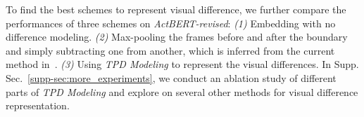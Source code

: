 \documentclass[runningheads]{llncs}
\begin{document}
To find the best schemes to represent visual difference, we further compare the performances of three schemes on \textit{ActBERT-revised}: \textit{(1)} Embedding with no difference modeling. \textit{(2)} Max-pooling the frames before and after the boundary and simply subtracting one from another, which is inferred from the current method in~\cite{park2019robust}. \textit{(3)} Using \textit{TPD Modeling} to represent the visual differences. In Supp. Sec.~\ref{supp-sec:more_experiments}, we conduct an ablation study of different parts of \textit{TPD Modeling} and explore on several other methods for visual difference representation.


\begin{table}[t]
\begin{center}
\caption{\textit{Upper}. Ablation study results of the Boundary Captioning utilizing \textit{ActBERT-revised} with \textit{TPD Modeling} employed to all rows with "ResNet-roi". \textit{Lower}. The performance comparison of visual difference modeling methods, where the \textit{TPD Modeling} is employed to the last row}
\label{table:captioning_ablation}
\end{center}
\end{table}
\end{document}
